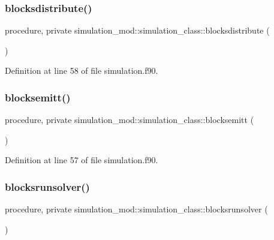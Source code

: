\subsubsection{\texorpdfstring{blocksdistribute()}{blocksdistribute()}}
{\footnotesize\ttfamily procedure, private simulation\+\_\+mod\+::simulation\+\_\+class\+::blocksdistribute (\begin{DoxyParamCaption}{ }\end{DoxyParamCaption})\hspace{0.3cm}{\ttfamily [private]}}



Definition at line 58 of file simulation.\+f90.

\mbox{\label{structsimulation__mod_1_1simulation__class_a6e740eee52324299ca5f6acd98d0c657}} 
\subsubsection{\texorpdfstring{blocksemitt()}{blocksemitt()}}
{\footnotesize\ttfamily procedure, private simulation\+\_\+mod\+::simulation\+\_\+class\+::blocksemitt (\begin{DoxyParamCaption}{ }\end{DoxyParamCaption})\hspace{0.3cm}{\ttfamily [private]}}



Definition at line 57 of file simulation.\+f90.

\mbox{\label{structsimulation__mod_1_1simulation__class_aa4e34759252b0517c37c79c95ece1167}} 
\subsubsection{\texorpdfstring{blocksrunsolver()}{blocksrunsolver()}}
{\footnotesize\ttfamily procedure, private simulation\+\_\+mod\+::simulation\+\_\+class\+::blocksrunsolver (\begin{DoxyParamCaption}{ }\end{DoxyParamCaption})\hspace{0.3cm}{\ttfamily [private]}}



